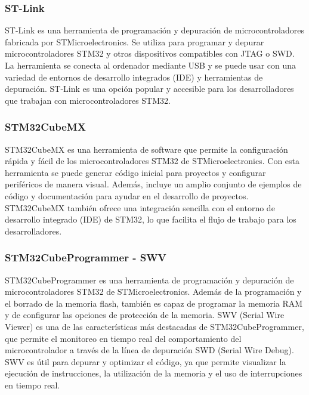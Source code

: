 \subsubsection{ST-Link}

ST-Link es una herramienta de programación y depuración de microcontroladores fabricada por STMicroelectronics. Se utiliza para programar y depurar microcontroladores STM32 y otros dispositivos compatibles con JTAG o SWD. La herramienta se conecta al ordenador mediante USB y se puede usar con una variedad de entornos de desarrollo integrados (IDE) y herramientas de depuración. ST-Link es una opción popular y accesible para los desarrolladores que trabajan con microcontroladores STM32.


\subsubsection{STM32CubeMX}

STM32CubeMX es una herramienta de software que permite la configuración rápida y fácil de los microcontroladores STM32 de STMicroelectronics. Con esta herramienta se puede generar código inicial para proyectos y configurar periféricos de manera visual. Además, incluye un amplio conjunto de ejemplos de código y documentación para ayudar en el desarrollo de proyectos. STM32CubeMX también ofrece una integración sencilla con el entorno de desarrollo integrado (IDE) de STM32, lo que facilita el flujo de trabajo para los desarrolladores.


\subsubsection{STM32CubeProgrammer - SWV}

STM32CubeProgrammer es una herramienta de programación y depuración de microcontroladores STM32 de STMicroelectronics. Además de la programación y el borrado de la memoria flash, también es capaz de programar la memoria RAM y de configurar las opciones de protección de la memoria. SWV (Serial Wire Viewer) es una de las características más destacadas de STM32CubeProgrammer, que permite el monitoreo en tiempo real del comportamiento del microcontrolador a través de la línea de depuración SWD (Serial Wire Debug). SWV es útil para depurar y optimizar el código, ya que permite visualizar la ejecución de instrucciones, la utilización de la memoria y el uso de interrupciones en tiempo real.


